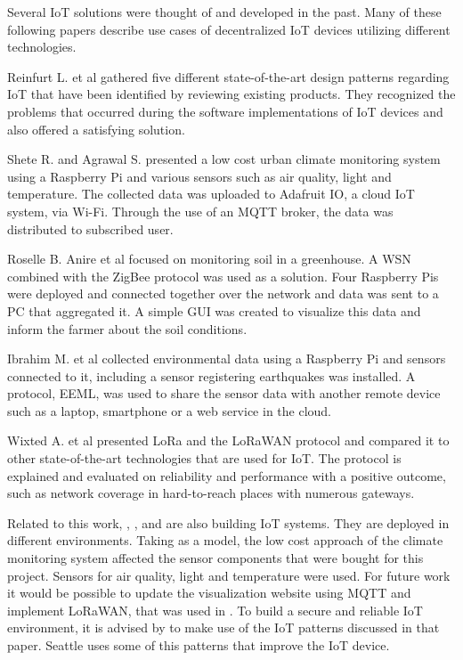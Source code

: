 \documentclass{article}      %
\begin{document}
Several \gls{IoT} solutions were thought of and developed in the past.  Many of these following papers describe use cases of decentralized \gls{IoT} devices utilizing different technologies. 

Reinfurt L. et al \cite{iotPatterns} gathered five different state-of-the-art design patterns regarding \gls{IoT} that have been identified by reviewing existing products. They recognized the problems that occurred during the software implementations of \gls{IoT} devices and also offered a satisfying solution. 

Shete R. and Agrawal S. \cite{urbanRasp} presented a low cost urban climate monitoring system using a Raspberry Pi and various sensors such as air quality, light and temperature. The collected data was uploaded to Adafruit IO, a cloud \gls{IoT} system, via Wi-Fi. Through the use of an \gls{MQTT} broker, the data was distributed to subscribed user.

Roselle B. Anire et al \cite{raspNet} focused on monitoring soil in a greenhouse. A \gls{WSN} combined with the ZigBee protocol was used as a solution. Four Raspberry Pis were deployed and connected together over the network and data was sent to a PC that aggregated it. A simple \gls{GUI} was created to visualize this data and inform the farmer about the soil conditions.

Ibrahim M. et al \cite{smartEnv} collected environmental data using a Raspberry Pi and sensors connected to it, including a sensor registering earthquakes was installed. A protocol, \gls{EEML}, was used to share the sensor data with another remote device such as a laptop, smartphone or a web service in the cloud. 

Wixted A. et al \cite{loraEval} presented LoRa and the LoRaWAN protocol and compared it to other state-of-the-art technologies that are used for \gls{IoT}. The protocol is explained and evaluated on reliability and performance with a positive outcome, such as network coverage in hard-to-reach places with numerous gateways. 

Related to this work, \cite{urbanRasp}, \cite{raspNet}, and \cite{smartEnv} are also building \gls{IoT} systems. They are deployed in different environments. Taking \cite{urbanRasp} as a model, the low cost approach of the climate monitoring system affected the sensor components that were bought for this project. Sensors for air quality, light and temperature were used. For future work it would be possible to update the visualization website using \gls{MQTT} and implement LoRaWAN, that was used in \cite{loraEval}. To build a secure and reliable \gls{IoT} environment, it is advised by \cite{iotPatterns} to make use of the \gls{IoT} patterns discussed in that paper. Seattle uses some of this patterns that improve the \gls{IoT} device.
\end{document}

